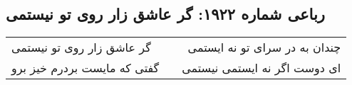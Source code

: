 \begin{center}
\section*{رباعی شماره ۱۹۲۲: گر عاشق زار روی تو نیستمی}
\label{sec:1922}
\begin{longtable}{l p{0.5cm} r}
گر عاشق زار روی تو نیستمی
&&
چندان به در سرای تو نه ایستمی
\\
گفتی که مایست بردرم خیز برو
&&
ای دوست اگر نه ایستمی نیستمی
\\
\end{longtable}
\end{center}
